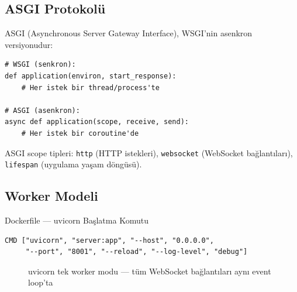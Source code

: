 \subsection{ASGI Protokol\"{u}}
\label{sec:asgi}

ASGI (Asynchronous Server Gateway Interface), WSGI'nin asenkron versiyonudur:

\begin{lstlisting}[caption={WSGI ve ASGI aray\"{u}z kar\c{s}{\i}la\c{s}t{\i}rmas{\i}},label={lst:wsgi-asgi}]
# WSGI (senkron):
def application(environ, start_response):
    # Her istek bir thread/process'te

# ASGI (asenkron):
async def application(scope, receive, send):
    # Her istek bir coroutine'de
\end{lstlisting}

ASGI scope tipleri: \texttt{http} (HTTP istekleri), \texttt{websocket} (WebSocket ba\u{g}lant{\i}lar{\i}), \texttt{lifespan} (uygulama ya\c{s}am d\"{o}ng\"{u}s\"{u}).

\subsection{Worker Modeli}
\label{sec:worker-model}

\begin{kodref}{Dockerfile --- uvicorn Ba\c{s}latma Komutu}
\begin{lstlisting}
CMD ["uvicorn", "server:app", "--host", "0.0.0.0",
     "--port", "8001", "--reload", "--log-level", "debug"]
\end{lstlisting}
\end{kodref}

\begin{figure}[H]
\centering
{}
\caption{uvicorn tek worker modu --- t\"{u}m WebSocket ba\u{g}lant{\i}lar{\i} ayn{\i} event loop'ta}
\label{fig:uvicorn-single}
\end{figure}

